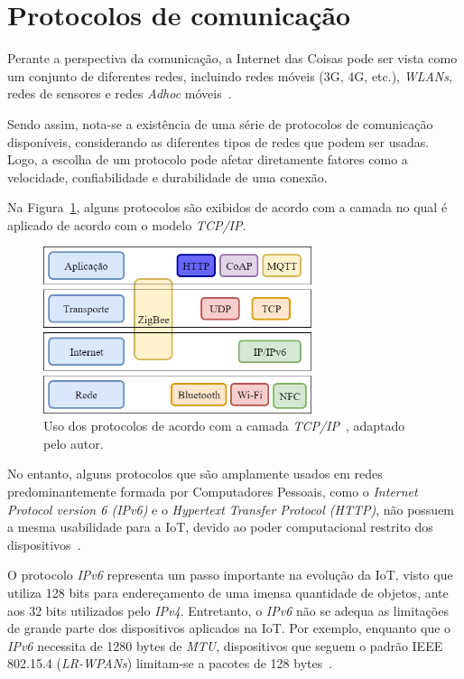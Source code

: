 \section{Protocolos de comunicação}

Perante a perspectiva da comunicação, a Internet das Coisas pode ser vista como um conjunto de diferentes redes, incluindo redes móveis (3G, 4G, etc.), \textit{WLANs}, redes de sensores e redes \textit{Adhoc} móveis~\cite{buyya2016internet}.

Sendo assim, nota-se a existência de uma série de protocolos de comunicação disponíveis, considerando as diferentes tipos de redes que podem ser usadas. Logo, a escolha de um protocolo pode afetar diretamente fatores como a velocidade, confiabilidade e durabilidade de uma conexão.

Na Figura~\ref{fig:iot_protocols}, alguns protocolos são exibidos de acordo com a camada no qual é aplicado de acordo com o modelo \textit{TCP/IP}.

\begin{figure}[ht]
\centering
\includegraphics[width=0.7\textwidth]{imagens/iot_protocols.png}
\caption{Uso dos protocolos de acordo com a camada \textit{TCP/IP}~\cite{buyya2016internet}, adaptado pelo autor.
\label{fig:iot_protocols}}
\end{figure}
\FloatBarrier

No entanto, alguns protocolos que são amplamente usados em redes predominantemente formada por Computadores Pessoais, como o \textit{Internet Protocol version 6 (IPv6)} e o \textit{Hypertext Transfer Protocol (HTTP)}, não possuem a mesma usabilidade para a IoT, devido ao poder computacional restrito dos dispositivos~\cite{iot2016}.

O protocolo \textit{IPv6} representa um passo importante na evolução da IoT, visto que utiliza 128 bits para endereçamento de uma imensa quantidade de objetos, ante aos 32 bits utilizados pelo \textit{IPv4}. Entretanto, o \textit{IPv6} não se adequa as limitações de grande parte dos dispositivos aplicados na IoT. Por exemplo, enquanto que o \textit{IPv6} necessita de 1280 bytes de \textit{MTU}, dispositivos que seguem o padrão IEEE 802.15.4 (\textit{LR-WPANs}) limitam-se a pacotes de 128 bytes~\cite{iot2016}.

